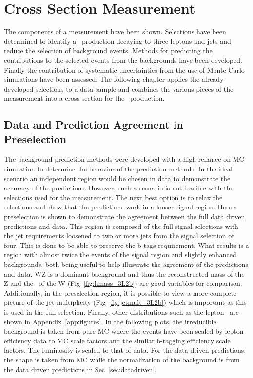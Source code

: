\chapter{\ttZ Cross Section Measurement}
The components of a measurement have been shown. Selections have been determined to identify a \ttZ \ production decaying to three leptons and jets and reduce the selection of background events. Methods for predicting the contributions to the selected events from the backgrounds have been developed. Finally the contribution of systematic uncertainties from the use of Monte Carlo simulations have been assessed. The following chapter applies the already developed selections to a data sample and combines the various pieces of the measurement into a cross section for the \ttZ \ production.\\

         \section{Data and Prediction Agreement in Preselection}

         The background prediction methods were developed with a high reliance on MC simulation to determine the behavior of the prediction methods. In the ideal scenario an independent region would be chosen in data to demonstrate the accuracy of the predictions. However, such a scenario is not feasible with the selections used for the \ttZ measurement. The next best option is to relax the selections and show that the predictions work in a looser signal region. Here a preselection is shown to demonstrate the agreement between the full data driven predictions and data. This region is composed of the full signal selections with the jet requirements loosened to two or more jets from the signal selection of four. This is done to be able to preserve the b-tags requirement. What results is a region with almost twice the events of the signal region and slightly enhanced backgrounds, both being useful to help illustrate the agreement of the predictions and data. WZ is a dominant background and thus the reconstructed mass of the Z and the \Mt \ of the W (Fig~\ref{fig:hmass_3L2b}) are good variables for comparison. Additionally, in the preselection region, it is possible to view a more complete picture of the jet multiplicity (Fig~\ref{fig:jetmult_3L2b}) which is important as this is used in the full selection. Finally, other distributions such as the lepton \pt \ are shown in Appendix~\ref{app:figures}. In the following plots, the irreducible background is taken from pure MC where the events have been scaled by lepton efficiency data to MC scale factors and the similar b-tagging efficiency scale factors. The luminosity is scaled to that of data. For the data driven predictions, the shape is taken from MC while the normalization of the background is from the data driven predictions in Sec~\ref{sec:datadriven}.


